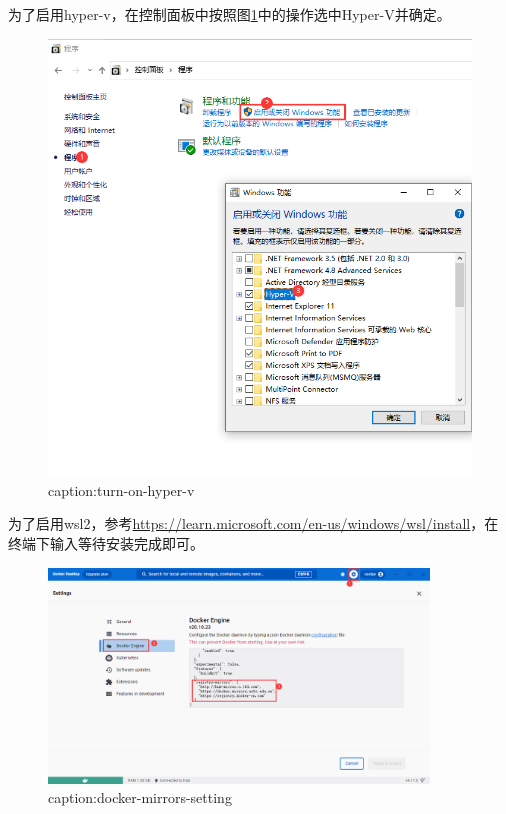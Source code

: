为了启用hyper-v，在控制面板中按照图\ref{fig:turn-on-hyper-v}中的操作选中Hyper-V并确定。
\begin{figure}[htbp]
	\centering
	\includegraphics[width=1\textwidth]{figures/turn-on-hyper-v.png}
	\caption{caption:turn-on-hyper-v}
	\label{fig:turn-on-hyper-v}
\end{figure}

为了启用wsl2，参考\url{https://learn.microsoft.com/en-us/windows/wsl/install}，在终端下输入等待安装完成即可。

\begin{figure}[htbp]
	\centering
	\includegraphics[width=0.9\textwidth]{figures/docker-mirrors-setting.png}
	\caption{caption:docker-mirrors-setting}
	\label{fig:docker-mirrors-setting}
\end{figure}

